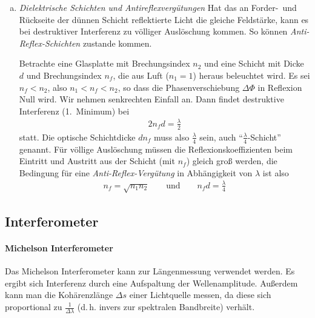 \begin{enumerate}[a)]
\item \emph{Dielektrische Schichten und Antireflexvergütungen}
  Hat das an Forder-~und Rückseite der dünnen Schicht reflektierte Licht
  die gleiche Feldstärke, kann es bei destruktiver Interferenz zu
  völliger Auslöschung kommen. 
  So können \emph{Anti-Reflex-Schichten}
  zustande kommen.

  Betrachte eine Glasplatte mit Brechungsindex $n_2$ und eine Schicht
  mit Dicke $d$ und Brechungsindex $n_f$, die aus Luft ($n_1=1$) heraus
  beleuchtet wird. Es sei $n_f<n_2$, also $n_1<n_f<n_2$, so dass die
  Phasenverschiebung $\Delta\Phi$ in Reflexion Null wird.
  Wir nehmen senkrechten Einfall an. Dann findet destruktive
  Interferenz (1.~Minimum) bei
  \begin{gather*}
    2n_fd = \frac{\lambda}{2}
  \end{gather*}
  statt. Die optische Schichtdicke $dn_f$ muss also
  $\frac{\lambda}{4}$ sein, auch \enquote{$\frac{\lambda}{4}$-Schicht}
  genannt.
  Für völlige Auslöschung müssen die Reflexionskoeffizienten beim
  Eintritt und Austritt aus der Schicht (mit $n_f$) gleich groß
  werden, die Bedingung für eine 
  \emph{Anti-Reflex-Vergütung} in
  Abhängigkeit von $\lambda$ ist also
  \begin{gather*}
    n_f = \sqrt{n_1n_2} 
    \qquad\text{und}\qquad
    n_fd = \frac{\lambda}{4}
  \end{gather*}

\end{enumerate}


\subsection{Interferometer}
\paragraph{Michelson Interferometer}%

Das Michelson Interferometer kann zur Längenmessung verwendet werden.
Es ergibt sich Interferenz durch eine Aufspaltung der Wellenamplitude.
Außerdem kann man die Kohärenzlänge $\Delta s$ einer Lichtquelle
messen, da diese sich proportional zu $\frac{1}{\Delta\lambda}$
(d.\,h. invers zur spektralen Bandbreite) verhält.


